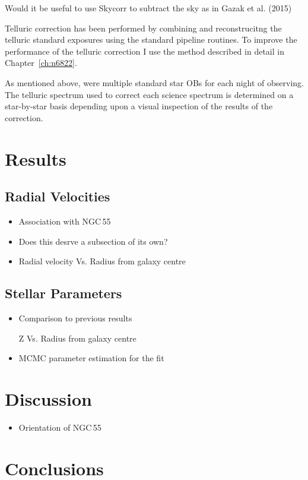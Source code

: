 Would it be useful to use Skycorr to subtract the sky as in Gazak et al. (2015)

Telluric correction has been performed by combining and reconstrucitng the telluric standard exposures using the standard pipeline routines.
To improve the performance of the telluric correction I use the method described in detail in Chapter~\ref{ch:n6822}.

As mentioned above, were multiple standard star OBs for each night of observing.
The telluric spectrum used to correct each science spectrum is determined on a star-by-star basis depending upon a visual inspection of the results of the correction.


\section{Results} %
\label{sec:results}

\subsection{Radial Velocities} %
\label{sub:rvs}
\begin{itemize}
    \item Association with NGC\,55
    \item Does this desrve a subsection of its own?
    \item Radial velocity Vs. Radius from galaxy centre
\end{itemize}
\subsection{Stellar Parameters} %
\label{sub:stellar_parameters}
\begin{itemize}
    \item Comparison to previous results
    \item [Z] Vs. Radius from galaxy centre
    \item MCMC parameter estimation for the fit
    \end{itemize}



\section{Discussion} %
\label{sec:discussion}

\begin{itemize}
    \item Orientation of NGC\,55
\end{itemize}

\section{Conclusions} %
\label{sec:conclusions}


